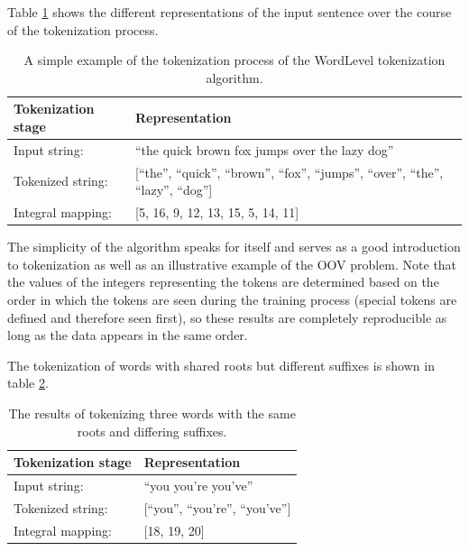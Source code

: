 \documentclass[12pt]{article}
\begin{document}
Table \ref{tab:wordlevel_tokenization_example} shows the different representations of the input sentence over the course of the tokenization process.

\begin{table}[h!]
    \centering
    \begin{tabular}{l l}
        \toprule
        Tokenization stage & Representation                                                                            \\
        \midrule
        Input string:      & ``the quick brown fox jumps over the lazy dog''                                           \\
        Tokenized string:  & [``the'', ``quick'', ``brown'', ``fox'', ``jumps'', ``over'', ``the'', ``lazy'', ``dog''] \\
        Integral mapping:  & [5, 16, 9, 12, 13, 15, 5, 14, 11]                                                         \\
        \bottomrule
    \end{tabular}
    \caption{A simple example of the tokenization process of the WordLevel tokenization algorithm.}
    \label{tab:wordlevel_tokenization_example}
\end{table}

\noindent
The simplicity of the algorithm speaks for itself and serves as a good introduction to tokenization as well as an illustrative example of the OOV
problem. Note that the values of the integers representing the tokens are determined based on the order in which the tokens are seen during the
training process (special tokens are defined and therefore seen first), so these results are completely reproducible as long as the data appears in
the same order.

The tokenization of words with shared roots but different suffixes is shown in table \ref{tab:wordlevel_tokenization_shared_roots_example}.

\begin{table}[h!]
    \centering
    \begin{tabular}{l l}
        \toprule
        Tokenization stage & Representation                    \\
        \midrule
        Input string:      & ``you you're you've''             \\
        Tokenized string:  & [``you'', ``you're'', ``you've''] \\
        Integral mapping:  & [18, 19, 20]                      \\
        \bottomrule
    \end{tabular}
    \caption{The results of tokenizing three words with the same roots and differing suffixes.}
    \label{tab:wordlevel_tokenization_shared_roots_example}
\end{table}
\end{document}
